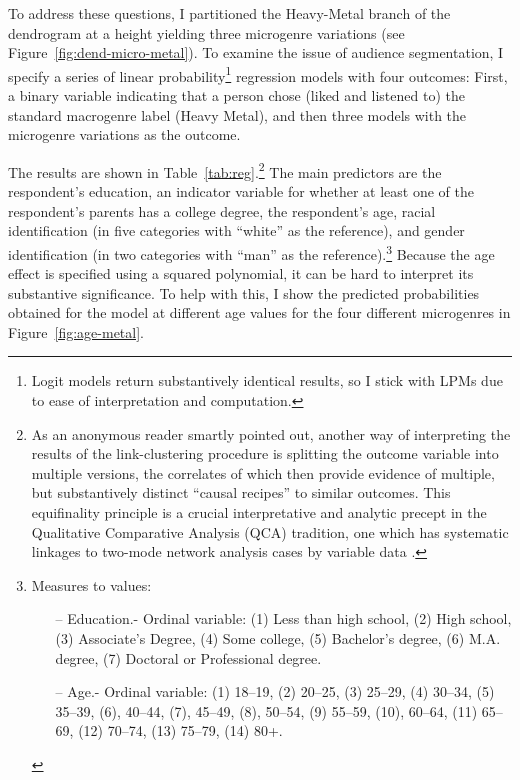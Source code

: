 \documentclass[a4paper,12pt]{extarticle}
\begin{document}
To address these questions, I partitioned the Heavy-Metal branch of the dendrogram at a height yielding three microgenre variations (see Figure~\ref{fig:dend-micro-metal}). To examine the issue of audience segmentation, I specify a series of linear probability\footnote{Logit models return substantively identical results, so I stick with LPMs due to ease of interpretation and computation.} regression models with four outcomes: First, a binary variable indicating that a person chose (liked and listened to) the standard macrogenre label (Heavy Metal), and then three models with the microgenre variations as the outcome. 

The results are shown in Table~\ref{tab:reg}.\footnote{As an anonymous reader smartly pointed out, another way of interpreting the results of the link-clustering procedure is splitting the outcome variable into multiple versions, the correlates of which then provide evidence of multiple, but substantively distinct ``causal recipes'' to similar outcomes. This equifinality principle is a crucial interpretative and analytic precept in the Qualitative Comparative Analysis (QCA) tradition, one which has systematic linkages to two-mode network analysis cases by variable data \citep{breiger2014comparative}.} The main predictors are the respondent's education, an indicator variable for whether at least one of the respondent's parents has a college degree, the respondent's age, racial identification (in five categories with ``white'' as the reference), and gender identification (in two categories with ``man'' as the reference).\footnote{Measures to values:
    \begin{itemize}
        \item[--] Education.- Ordinal variable: (1) Less than high school, (2) High school, (3) Associate's Degree, (4) Some college, (5) Bachelor's degree, (6) M.A. degree, (7) Doctoral or Professional degree.
        \item[--] Age.- Ordinal variable: (1) 18--19, (2) 20--25, (3) 25--29, (4) 30--34, (5) 35--39, (6), 40--44, (7), 45--49, (8), 50--54, (9) 55--59, (10), 60--64, (11) 65--69, (12) 70--74, (13) 75--79, (14) 80+.
    \end{itemize}}
Because the age effect is specified using a squared polynomial, it can be hard to interpret its substantive significance. To help with this, I show the predicted probabilities obtained for the model at different age values for the four different microgenres in Figure~\ref{fig:age-metal}.
\end{document}
